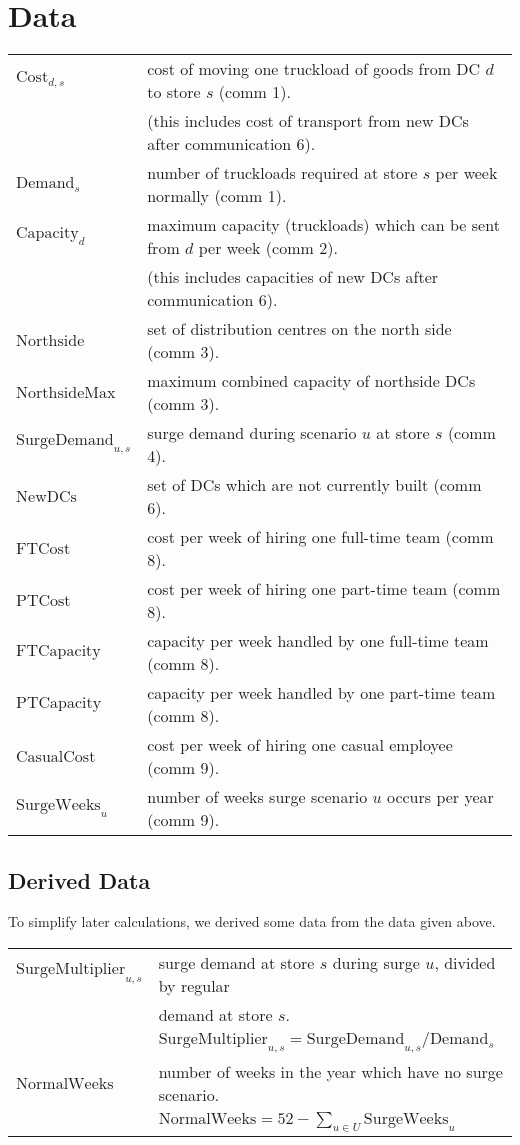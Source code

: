 \documentclass[11pt,a4paper]{article}
\begin{document}
\section{Data}
\begin{tabular}{l l}
    $\mathrm{Cost}_{d,s}$ & cost of moving one truckload of goods from DC $d$ to store $s$ (comm 1). \\
    &(this includes cost of transport from new DCs after communication 6).\\ 
    $\mathrm{Demand}_s$ & number of truckloads required at store $s$ per week normally (comm 1). \\
    $\mathrm{Capacity}_d$ & maximum capacity (truckloads) which can be sent from $d$ per week (comm 2).  \\
    & (this includes capacities of new DCs after communication 6).\\ 
    $\mathrm{Northside}$ & set of distribution centres on the north side (comm 3). \\ 
    $\mathrm{NorthsideMax}$ & maximum combined capacity of northside DCs (comm 3). \\ 
    $\mathrm{SurgeDemand}_{u,s}$ & surge demand during scenario $u$ at store $s$ (comm 4). \\ 
    $\mathrm{NewDCs}$ & set of DCs which are not currently built (comm 6).\\ 
    $\mathrm{FTCost}$& cost per week of hiring one full-time team (comm 8). \\
    $\mathrm{PTCost}$& cost per week of hiring one part-time team (comm 8). \\
    $\mathrm{FTCapacity}$& capacity per week handled by one full-time team (comm 8). \\
    $\mathrm{PTCapacity}$& capacity per week handled by one part-time team (comm 8). \\
    $\mathrm{CasualCost}$& cost per week of hiring one casual employee (comm 9). \\
    $\mathrm{SurgeWeeks}_u$ & number of weeks surge scenario $u$ occurs per year (comm 9).  
\end{tabular}

\subsection{Derived Data}
To simplify later calculations, we derived some data from the data given above.\\[0.8em]    
\begin{tabular}{l l}
    $\mathrm{SurgeMultiplier}_{u,s}$ & surge demand at store $s$ during surge $u$,  divided by regular \\ 
    &  demand at store $s$. \\ 
    &$\mathrm{SurgeMultiplier}_{u,s} = \mathrm{SurgeDemand}_{u,s} / \mathrm{Demand}_s $ \\
    $\mathrm{NormalWeeks}$ & number of weeks in the year which have no surge scenario. \\ 
    & $\mathrm{NormalWeeks} = 52-\sum_{u \in U} \mathrm{SurgeWeeks}_u $
\end{tabular}
\end{document}
